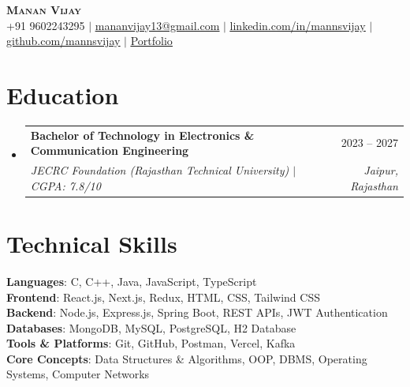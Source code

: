 \documentclass[letterpaper,11pt]{article}
\makeatletter
\newcommand{\resumeSubheading}[4]{
  \vspace{-2pt}\item
    \begin{tabular*}{0.97\textwidth}[t]{l@{\extracolsep{\fill}}r}
      \textbf{#1} & #2 \\
      \textit{\small#3} & \textit{\small #4} \\
    \end{tabular*}\vspace{-7pt}
}
\newcommand{\resumeSubHeadingListStart}{\begin{itemize}[leftmargin=0.15in, label={}]}
\newcommand{\resumeSubHeadingListEnd}{\end{itemize}}
\makeatother
\begin{document}

\begin{center}
    \textbf{\Huge \scshape Manan Vijay} \\ \vspace{3pt}
    \small
    +91 9602243295 $|$
    \href{mailto:mananvijay13@gmail.com}{\underline{mananvijay13@gmail.com}} $|$
    \href{https://www.linkedin.com/in/mannsvijay/}{\underline{linkedin.com/in/mannsvijay}} $|$
    \href{https://github.com/mannsvijay}{\underline{github.com/mannsvijay}} $|$
    \href{https://portfolio-mannsvijays-projects.vercel.app/}{\underline{Portfolio}}
\end{center}

\section{Education}
  \resumeSubHeadingListStart
    \resumeSubheading
      {Bachelor of Technology in Electronics \& Communication Engineering}{2023 --  2027}
      {JECRC Foundation (Rajasthan Technical University) $|$ CGPA: 7.8/10}{Jaipur, Rajasthan}
  \resumeSubHeadingListEnd



  \section{Technical Skills}
 \begin{itemize}[leftmargin=0.15in, label={}]
    \small{\item{
     \textbf{Languages}{: C, C++, Java, JavaScript, TypeScript} \\
     \textbf{Frontend}{: React.js, Next.js, Redux, HTML, CSS, Tailwind CSS} \\
     \textbf{Backend}{: Node.js, Express.js, Spring Boot, REST APIs, JWT Authentication} \\
     \textbf{Databases}{: MongoDB, MySQL, PostgreSQL, H2 Database} \\
     \textbf{Tools \& Platforms}{: Git, GitHub, Postman, Vercel, Kafka} \\
     \textbf{Core Concepts}{: Data Structures \& Algorithms, OOP, DBMS, Operating Systems, Computer Networks} \\
    }}
 \end{itemize}
\end{document}
